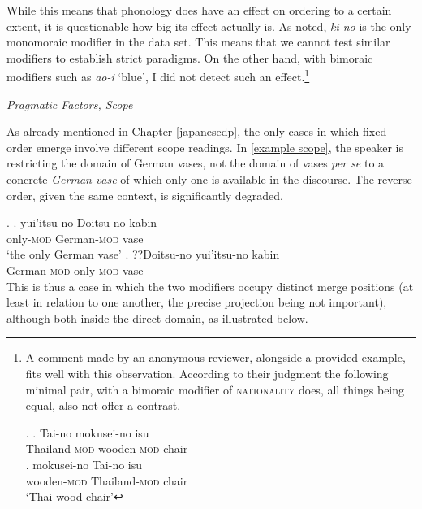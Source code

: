 \documentclass [output=book,colorlinks,citecolor=brown]{langscibook}
\begin{document}
While this means that phonology does have an effect on ordering to a certain extent, it is questionable how big its effect actually is. As noted, \textit{ki-no} is the only monomoraic modifier in the data set. This means that we cannot test similar modifiers to establish strict paradigms. On the other hand, with bimoraic modifiers such as \textit{ao-i} `blue’, I did not detect such an effect.\footnote{A comment made by an anonymous reviewer, alongside a provided example, fits well with this observation. According to their judgment the following minimal pair, with a bimoraic modifier of \textsc{nationality} does, all things being equal, also not offer a contrast.

\par

\ex. \ag. Tai-no mokusei-no isu\\
Thailand-\textsc{mod} wooden-\textsc{mod} chair\\
\bg. mokusei-no Tai-no isu\\
wooden-\textsc{mod} Thailand-\textsc{mod} chair\\
`Thai wood chair'

\par}

\emph{Pragmatic Factors, Scope}

\par


As already mentioned in Chapter \ref{japanesedp}, the only cases in which fixed order emerge involve different scope readings. In \ref{example scope}, the speaker is restricting the domain of German vases, not the domain of vases \textit{per se} to a concrete \textit{German vase} of which only one is available in the discourse. The reverse order, given the same context, is significantly degraded. %

\ex. \label{example scope} \ag. yui'itsu-no Doitsu-no kabin\\
only-\textsc{mod} German-\textsc{mod} vase\\
`the only German vase'
\bg. ??Doitsu-no yui'itsu-no kabin\\
German-\textsc{mod} only-\textsc{mod} vase\\

This is thus a case in which the two modifiers occupy distinct merge positions (at least in relation to one another, the precise projection being not important), although both inside the direct domain, as illustrated below.

\newpage
\end{document}
